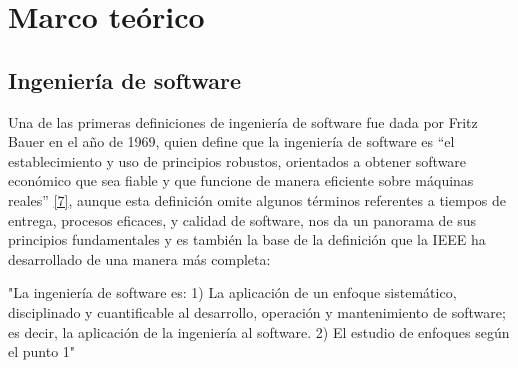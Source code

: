 \chapter{Marco teórico}

\section{Ingeniería de software}

%
%

Una de las primeras definiciones de ingeniería de software fue dada por Fritz Bauer en el año de 1969, quien define que la ingeniería de software es “el establecimiento y uso de principios robustos, orientados a obtener software económico que sea fiable y que funcione de manera eficiente sobre máquinas reales” \hyperlink{b07}{[7]}, aunque esta definición omite algunos términos referentes a tiempos de entrega, procesos eficaces, y calidad de software, nos da un panorama de sus principios fundamentales y es también la base de la definición que la IEEE ha desarrollado de una manera más completa: 

"La ingeniería de software es: 1) La aplicación de un enfoque sistemático, disciplinado y cuantificable al desarrollo, operación y mantenimiento de software; es decir, la aplicación de la ingeniería al software. 
2) El estudio de enfoques según el punto 1"

